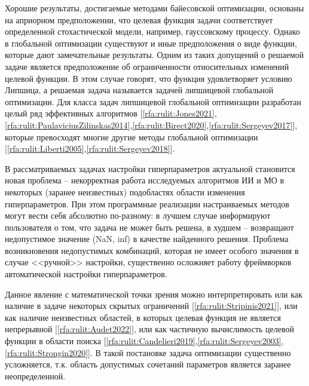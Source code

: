 \documentclass[a4paper,12pt,russian]{article}
\begin{document}
Хорошие результаты, достигаемые методами байесовской оптимизации, основаны на априорном предположении, что целевая функция задачи соответствует определенной стохастической модели, например, гауссовскому процессу. Однако в глобальной оптимизации существуют и иные предположения о виде функции, которые дают замечательные результаты.
Одним  из таких  допущений о решаемой  задаче является предположение об ограниченности относительных изменений целевой функции. В этом случае говорят, что функция удовлетворяет условию Липшица, а решаемая задача называется задачей липшицевой глобальной оптимизации. Для класса задач липшицевой глобальной оптимизации разработан целый ряд эффективных алгоритмов [\ref{rfa:rulit:Jones2021},\ref{rfa:rulit:PaulaviciusZilinskas2014},\ref{rfa:rulit:Birect2020},\ref{rfa:rulit:Sergeyev2017}], которые превосходят многие другие методы глобальной оптимизации [\ref{rfa:rulit:Liberti2005},\ref{rfa:rulit:Sergeyev2018}].

В рассматриваемых задачах настройки гиперпараметров актуальной становится новая проблема -- некорректная работа исследуемых алгоритмов ИИ и МО в некоторых (заранее неизвестных) подобластях области изменения гиперпараметров. 
При этом программные реализации настраиваемых методов могут вести себя абсолютно по-разному: в лучшем случае информируют пользователя о том, что задача не может быть решена, в худшем -- возвращают недопустимое значение (NaN, inf) в качестве найденного решения. Проблема возникновения недопустимых комбинаций, которая не имеет особого значения в случае <<ручной>> настройки, существенно осложняет работу фреймворков автоматической настройки гиперпараметров.

Данное явление с математической точки зрения можно интерпретировать или как наличие в задаче некоторых скрытых ограничений [\ref{rfa:rulit:Stripinis2021}], или как наличие неизвестных областей, в которых целевая функция не является непрерывной [\ref{rfa:rulit:Audet2022}], или как частичную вычислимость целевой функции в области поиска [\ref{rfa:rulit:Candelieri2019},\ref{rfa:rulit:Sergeyev2003},\ref{rfa:rulit:Strongin2020}]. В такой постановке задача оптимизации существенно усложняется, т.к. область допустимых сочетаний параметров является заранее неопределенной.

\end{document}
